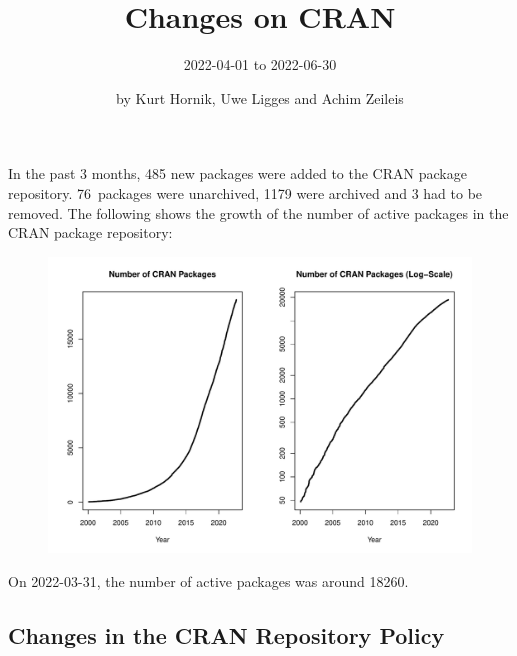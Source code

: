 \title{Changes on CRAN}
\subtitle{2022-04-01 to 2022-06-30}
\author{by Kurt Hornik, Uwe Ligges and Achim Zeileis}
\maketitle

\sloppy


In the past 3 months, 485 new packages were added to the CRAN package
repository.  76~packages were unarchived, 1179 were archived and 3 had
to be removed.  The following shows the growth of the number of active
packages in the CRAN package repository:

\begin{figure}[h]
  \centering
  \includegraphics[width=5in]{cran_growth}
\end{figure}

\noindent
On 2022-03-31, the number of active packages was around 18260.

\subsection{Changes in the CRAN Repository Policy}


